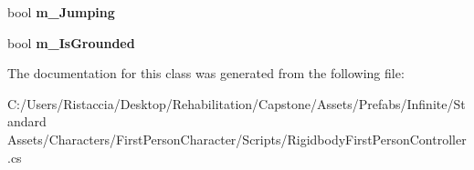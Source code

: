 \begin{DoxyCompactItemize}
\mbox{\label{class_unity_standard_assets_1_1_characters_1_1_first_person_1_1_rigidbody_first_person_controller_a17c0ff295e7e5f2fb8ce4e6271a9e2bf}} 
bool {\bfseries m\+\_\+\+Jumping}
\item 
\mbox{\label{class_unity_standard_assets_1_1_characters_1_1_first_person_1_1_rigidbody_first_person_controller_aaaddb3904a4d245285996c84fac510e2}} 
bool {\bfseries m\+\_\+\+Is\+Grounded}
\end{DoxyCompactItemize}


The documentation for this class was generated from the following file\+:\begin{DoxyCompactItemize}
\item 
C\+:/\+Users/\+Ristaccia/\+Desktop/\+Rehabilitation/\+Capstone/\+Assets/\+Prefabs/\+Infinite/\+Standard Assets/\+Characters/\+First\+Person\+Character/\+Scripts/Rigidbody\+First\+Person\+Controller.\+cs\end{DoxyCompactItemize}
